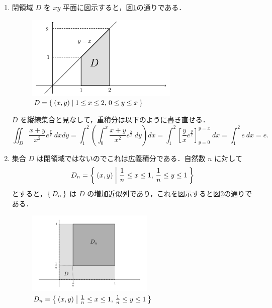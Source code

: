 \documentclass[11pt, uplatex, dvipdfmx]{jsarticle}
\begin{document}
\begin{enumerate}[(1)]
   \item 閉領域 $D$ を $xy$ 平面に図示すると，図\ref{fig:no15}の通りである．
     \begin{figure}[h]
       \centering
       \includegraphics[height=4cm]{./pictures/no15.pdf}
       \caption{ $D=\Set{(x,y)  |  1 \leq x \leq 2, \, 0 \leq y \leq x }$}\label{fig:no15}
     \end{figure}
     
     $D$ を縦線集合と見なして，重積分は以下のように書き直せる．
     \[
       \iint_D \frac{x+y}{x^2} e^{\frac{y}{x}} \ dx dy 
       = \int_{1}^{2} \left( \int_{0}^{x} \frac{x+y}{x^2}e^{\frac{y}{x}}\  dy \right)dx
       =\int_{1}^{2} \left[\frac{y}{x} e^{\frac{y}{x}} \right]_{y=0}^{y=x} \ dx
       =\int_{1}^{2} e \ dx = e.
     \]
     
   \item 集合 $D$ は閉領域ではないのでこれは広義積分である．自然数 $n$ に対して
     \[
       D_n = \Set{(x,y) | \frac{1}{n} \leq x \leq 1, \, \frac{1}{n} \leq y \leq 1}
     \]
     とすると，$\Set{D_n}$ は $D$ の増加近似列であり，これを図示すると図\ref{fig:no16}の通りである．
     \begin{figure}[h]
       \centering
       \includegraphics[height=4cm]{./pictures/no16.pdf}
       \caption{ $D_n=\Set{(x,y)  |  \frac{1}{n} \leq x \leq 1, \, \frac{1}{n} \leq y \leq 1}$}\label{fig:no16}
     \end{figure}



\end{enumerate}
\end{document}
